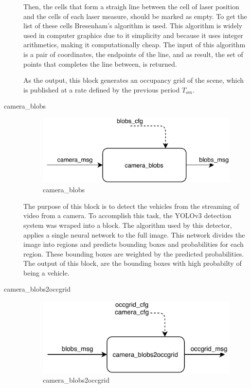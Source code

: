 \begin{description}
Then, the cells that form a straigh line between the cell of laser position and the cells of each laser measure, should be marked as empty. To get the list of these cells Bresenham's algorithm is used. This algorithm is widely used in computer graphics due to it simplicity and because it uses integer arithmetics, making it computationally cheap. The input of this algorithm is a pair of coordinates, the endpoints of the line, and as result, the set of points that completes the line between, is returned.

As the output, this block generates an occupancy grid of the scene, which is published at a rate defined by the previous period $T_{om}$.


\item[camera\_blobs] \hfill

\begin{figure}[ht!]
\centering
\includegraphics[scale=1]{fig/3/camera_blobs.pdf}
\caption{camera\_blobs}
\label{camera_blobs}
\end{figure}

The purpose of this block is to detect the vehicles from the streaming of video from a camera. To accomplish this task, the YOLOv3 detection system \cite{yolov3} was wraped into a block. The algorithm used by this detector, applies a single neural network to the full image. This network divides the image into regions and predicts bounding boxes and probabilities for each region. These bounding boxes are weighted by the predicted probabilities. The output of this block, are the bounding boxes with high probabilty of being a vehicle.


\item[camera\_blobs2occgrid] \hfill

\begin{figure}[ht!]
\centering
\includegraphics[scale=1]{fig/3/camera_blobs2occgrid.pdf}
\caption{camera\_blobs2occgrid}
\label{camera_blobs2occgrid}
\end{figure}


\end{description}
